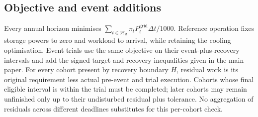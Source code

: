\subsection{Objective and event additions}
Every annual horizon minimises $\sum_{t\in\mathcal H_d}\pi_tP_t^{\mathrm{grid}}\Delta t/1000$. Reference operation fixes storage powers to zero and workload to arrival, while retaining the cooling optimisation. Event trials use the same objective on their event-plus-recovery intervals and add the signed target and recovery inequalities given in the main paper. For every cohort present by recovery boundary $H$, residual work is its original requirement less actual pre-event and trial execution. Cohorts whose final eligible interval is within the trial must be completed; later cohorts may remain unfinished only up to their undisturbed residual plus tolerance. No aggregation of residuals across different deadlines substitutes for this per-cohort check.
